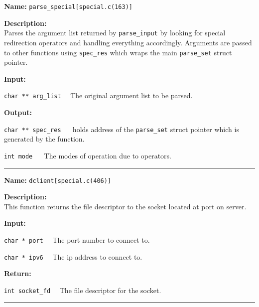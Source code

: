 \documentclass[11pt,a4paper]{article}
\begin{document}
\begin{description}
\item \textbf{Name:} 
\verb|parse_special[special.c(163)]|

\item \textbf{Description:}\\
Parses the argument list returned by \verb|parse_input| by looking for special redirection operators and handling everything accordingly. Arguments are passed to other functions using \verb|spec_res| which wraps the main \verb|parse_set| struct pointer.

\item \textbf{Input:}
\begin{description}
\item \verb|char ** arg_list|~~ The original argument list to be parsed.
\end{description}

\item \textbf{Output:}
\begin{description}
\item \verb|char ** spec_res| ~~ holds address of the \verb|parse_set| struct pointer which is generated by the function.
\item \verb|int mode| ~~ The modes of operation due to operators.
\end{description}
\end{description}\hrule

\begin{description}
\item \textbf{Name:} 
\verb|dclient[special.c(406)]|

\item \textbf{Description:}\\
 This function returns the file descriptor to the socket located at port on server.

\item \textbf{Input:}
\begin{description}
\item \verb|char * port|~~ The port number to connect to.
\item \verb|char * ipv6|~~ The ip address to connect to.
\end{description}

\item \textbf{Return:}
\begin{description}
\item \verb|int socket_fd|~~ The file descriptor for the socket.
\end{description}
\end{description}\hrule
\end{document}

